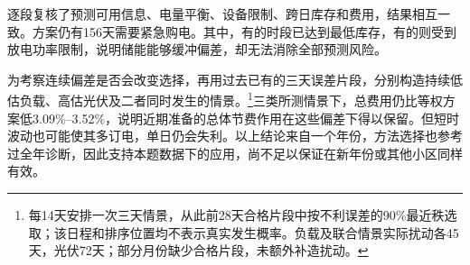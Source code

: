 \documentclass[11pt,a4paper]{article}
\begin{document}
逐段复核了预测可用信息、电量平衡、设备限制、跨日库存和费用，结果相互一致。方案仍有156天需要紧急购电。其中，有的时段已达到最低库存，有的则受到放电功率限制，说明储能能够缓冲偏差，却无法消除全部预测风险。

为考察连续偏差是否会改变选择，再用过去已有的三天误差片段，分别构造持续低估负载、高估光伏及二者同时发生的情景。\footnote{每14天安排一次三天情景，从此前28天合格片段中按不利误差的90\%最近秩选取；该日程和排序位置均不表示真实发生概率。负载及联合情景实际扰动各45天，光伏72天；部分月份缺少合格片段，未额外补造扰动。}三类所测情景下，总费用仍比等权方案低3.09\%--3.52\%，说明近期准备的总体节费作用在这些偏差下得以保留。但短时波动也可能使其多订电，单日仍会失利。以上结论来自一个年份，方法选择也参考过全年诊断，因此支持本题数据下的应用，尚不足以保证在新年份或其他小区同样有效。
\end{document}
